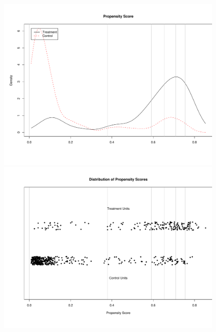 \documentclass[oneside,letterpaper,titlepage]{article}
\begin{document}
\begin{figure}[tbp]
  \begin{center}
    {\includegraphics[scale=0.25]{figs/subclass1}}
    {\includegraphics[scale=0.25]{figs/subclass2}}

\end{center}
\end{figure}
\end{document}
